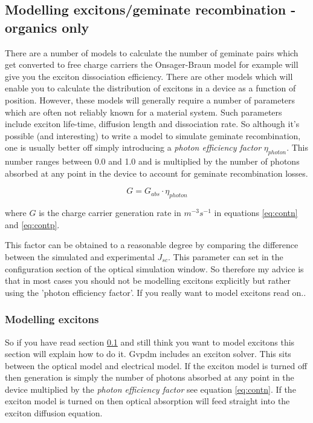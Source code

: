 
\subsection{Modelling excitons/geminate recombination - organics only}
\label{sec:dont_do_excitions}
There are a number of models to calculate the number of geminate pairs which get converted to free charge carriers the Onsager-Braun model for example will give you the exciton dissociation efficiency.  There are other models which will enable you to calculate the distribution of excitons in a device as a function of position.  However, these models will generally require a number of parameters which are often not reliably known for a material system. Such parameters include exciton life-time, diffusion length and dissociation rate. So although it's possible (and interesting) to write a model to simulate geminate recombination, one is usually better off simply introducing a \emph{photon efficiency factor} $\eta_{photon}$. This number ranges between 0.0 and 1.0 and is multiplied by the number of photons absorbed at any point in the device to account for geminate recombination losses.

\begin{equation}
\label{eq:contn}
G=G_{abs}\cdot \eta_{photon}
\end{equation}

where $G$ is the charge carrier generation rate in $m^{-3}s^{-1}$ in equations \ref{eq:contn} and  \ref{eq:contp}.
 
This factor can be obtained to a reasonable degree by comparing the difference between the simulated and experimental $J_{sc}$.  This parameter can set in the configuration section of the optical simulation window. So therefore my advice is that in most cases you should not be modelling excitons explicitly but rather using the 'photon efficiency factor'. If you really want to model excitons read on..

\subsubsection{Modelling excitons}
\label{sec:excitions}
So if you have read section \ref{sec:dont_do_excitions} and still think you want to model excitons this section will explain how to do it.  Gvpdm includes an exciton solver. This sits between the optical model and electrical model.  If the exciton model is turned off then generation is simply the number of photons absorbed at any point in the device multiplied by the \emph{photon efficiency factor} see equation \ref{eq:contn}. If the exciton model is turned on then optical absorption will feed straight into the exciton diffusion equation.


